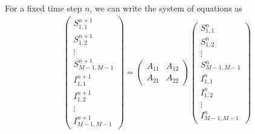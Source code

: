 For a fixed time step \(n\), we can write the system of equations as
\begin{align*}
  \begin{pmatrix}
    S_{1,1}^{n+1}     \\
    S_{1,2}^{n+1}     \\
    \vdots            \\
    S_{M-1,M-1}^{n+1} \\
    I_{1,1}^{n+1}     \\
    I_{1,2}^{n+1}     \\
    \vdots            \\
    I_{M-1,M-1}^{n+1}
  \end{pmatrix}
  =
  \begin{pmatrix}
    A_{11} & A_{12} \\
    A_{21} & A_{22}
  \end{pmatrix}
  \begin{pmatrix}
    S_{1,1}^n     \\
    S_{1,2}^n     \\
    \vdots        \\
    S_{M-1,M-1}^n \\
    I_{1,1}^n     \\
    I_{1,2}^n     \\
    \vdots        \\
    I_{M-1,M-1}^n
  \end{pmatrix}
\end{align*}


